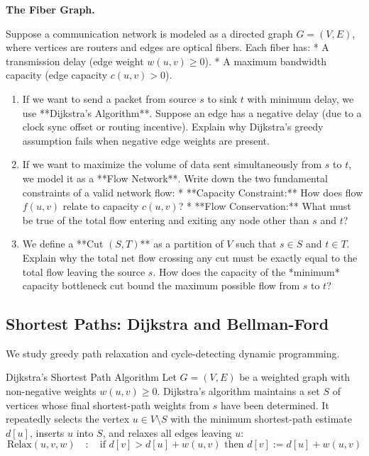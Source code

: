 \documentclass[12pt, a4paper]{book}
\begin{document}
\begin{puzzlebox}
\textbf{The Fiber Graph.}

Suppose a communication network is modeled as a directed graph $G = (V, E)$, where vertices are routers and edges are optical fibers.
Each fiber has:
* A transmission delay (edge weight $w(u, v) \ge 0$).
* A maximum bandwidth capacity (edge capacity $c(u, v) > 0$).
\begin{enumerate}[label=(\alph*), leftmargin=*]
  \item If we want to send a packet from source $s$ to sink $t$ with minimum delay, we use **Dijkstra's Algorithm**.
        Suppose an edge has a negative delay (due to a clock sync offset or routing incentive).
        Explain why Dijkstra's greedy assumption fails when negative edge weights are present.
  \item If we want to maximize the volume of data sent simultaneously from $s$ to $t$, we model it as a **Flow Network**.
        Write down the two fundamental constraints of a valid network flow:
        * **Capacity Constraint:** How does flow $f(u, v)$ relate to capacity $c(u, v)$?
        * **Flow Conservation:** What must be true of the total flow entering and exiting any node other than $s$ and $t$?
  \item We define a **Cut $(S, T)$** as a partition of $V$ such that $s \in S$ and $t \in T$.
        Explain why the total net flow crossing any cut must be exactly equal to the total flow leaving the source $s$.
        How does the capacity of the *minimum* capacity bottleneck cut bound the maximum possible flow from $s$ to $t$?
\end{enumerate}
\end{puzzlebox}

\subsection{Shortest Paths: Dijkstra and Bellman-Ford}

We study greedy path relaxation and cycle-detecting dynamic programming.

\begin{namedconcept}{Dijkstra's Shortest Path Algorithm}
Let $G = (V, E)$ be a weighted graph with non-negative weights $w(u, v) \ge 0$.
Dijkstra's algorithm maintains a set $S$ of vertices whose final shortest-path weights from $s$ have been determined.
It repeatedly selects the vertex $u \in V \setminus S$ with the minimum shortest-path estimate $d[u]$, inserts $u$ into $S$, and relaxes all edges leaving $u$:
\[
  \text{Relax}(u, v, w) \quad:\quad \text{if } d[v] > d[u] + w(u, v) \text{ then } d[v] := d[u] + w(u, v)
\]
\end{namedconcept}
\end{document}

